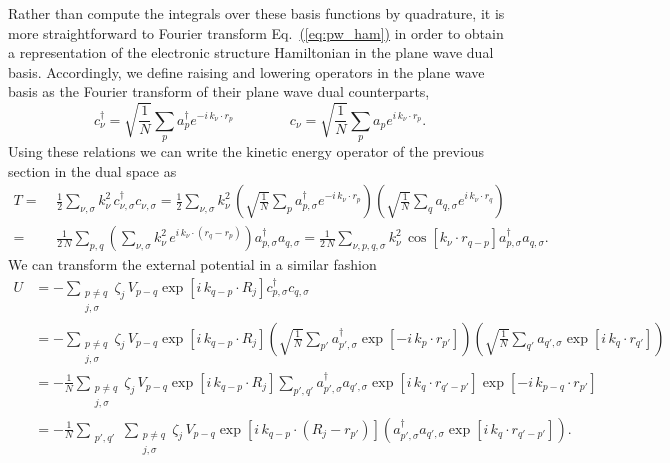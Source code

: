 \documentclass[superscriptaddress,aps,pra,nofootinbib,notitlepage,10pt,longbibliography]{revtex4-1}
\newcommand{\eq}[1]{Eq.~\hyperref[eq:#1]{(\ref*{eq:#1})}}
\begin{document}
Rather than compute the integrals over these basis functions by quadrature, it is more straightforward to Fourier transform \eq{pw_ham} in order to obtain a representation of the electronic structure Hamiltonian in the plane wave dual basis. Accordingly, we define raising and lowering operators in the plane wave basis as the Fourier transform of their plane wave dual counterparts,
\begin{equation}
\label{eq:ladder_def}
c^\dagger_\nu =  \sqrt{\frac{1}{N}}  \sum_{p} a^\dagger_{p} e^{- i \,k_\nu \cdot r_p}
\quad \quad \quad \quad
c_\nu =  \sqrt{\frac{1}{N}}  \sum_{p} a_{p} e^{i \, k_\nu \cdot r_p}.
\end{equation}
Using these relations we can write the kinetic energy operator of the previous section in the dual space as
\begin{align}
\label{eq:pwd_t}
T = \, &  \,  \frac{1}{2} \sum_{\nu, \sigma} k_\nu^2 \,  c_{\nu, \sigma}^\dagger c_{\nu, \sigma}
%
=  \frac{1}{2} \sum_{\nu, \sigma} k_\nu^2 \,  \left(\sqrt{\frac{1}{N}} \sum_{p} a_{p, \sigma}^\dagger e^{- i \, k_\nu \cdot r_p}\right) \left(\sqrt{\frac{1}{N}} \sum_{q} a_{q,\sigma} e^{i \, k_\nu \cdot r_q}\right)\\
%
=  \, & \,  \frac{1}{2 \, N} \sum_{p, q}  \left(\sum_{\nu, \sigma} k_\nu^2 \, e^{i \, k_\nu \cdot \left(r_q -r_p \right)} \right)a^\dagger_{p, \sigma} a_{q,\sigma} 
%
= \frac{1}{2\, N} \sum_{\nu, p, q, \sigma} k_\nu^2 \, \cos \left[k_\nu \cdot r_{q - p} \right] a^\dagger_{p, \sigma} a_{q,\sigma}. \nonumber
\end{align}
We can transform the external potential in a similar fashion
\begin{align}
U & = -\sum_{\substack{p \neq q \\ j,\sigma}}\zeta_j \, V_{p-q} \exp\left[i \, k_{q-p} \cdot R_j\right] c^\dagger_{p, \sigma} c_{q, \sigma}\\
%
& =  - \sum_{\substack{p \neq q \\ j,\sigma}}\zeta_j \, V_{p-q}  \exp\left[i \, k_{q-p} \cdot R_j\right]
\left(\sqrt{\frac{1}{N}} \sum_{p'} a_{p', \sigma}^\dagger \exp\left[- i \, k_p \cdot r_{p'}\right]\right)
\left(\sqrt{\frac{1}{N}} \sum_{q'} a_{q',\sigma} \exp\left[i \, k_q \cdot r_{q'}\right]\right)\nonumber\\
%
& =  -\frac{1}{N} \sum_{\substack{p \neq q \\ j,\sigma}} \zeta_j \, V_{p-q}  \exp\left[i \, k_{q-p} \cdot R_j\right]
 \sum_{p', q'} a_{p', \sigma}^\dagger a_{q',\sigma} \exp\left[i \, k_q \cdot r_{q'- p'} \right] \exp\left[- i \,k_{p-q} \cdot r_{p'}\right]\nonumber\\
%
& =  -\frac{1}{N} \sum_{\substack{p', q'}} \sum_{\substack{p \neq q \\ j, \sigma}} \zeta_j \, V_{p-q} \exp\left[i \, k_{q-p} \cdot \left(R_j - r_{p'}\right)\right]
\left(a_{p', \sigma}^\dagger a_{q',\sigma} \exp\left[i \, k_q \cdot r_{q'-p'}\right] \right) \nonumber.
\end{align}
\end{document}

